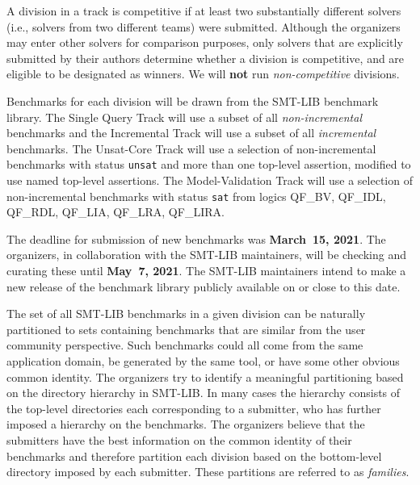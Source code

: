 \documentclass[12pt]{article}
\newcommand{\maintrack}{Single Query Track\xspace}
\newcommand{\inctrack}{Incremental Track\xspace}
\newcommand{\ucoretrack}{Unsat-Core Track\xspace}
\newcommand{\mvaltrack}{Model-Validation Track\xspace}
\newcommand{\challtrack}{Industry-Challenge Track\xspace}
\begin{document}
A division in a track is competitive if at least two substantially
different solvers (i.e., solvers from two different teams) were
submitted.  Although the organizers may enter other solvers for
comparison purposes, only solvers that are explicitly submitted by
their authors determine whether a division is competitive, and are
eligible to be designated as winners.
We will \textbf{not} run \emph{non-competitive} divisions.

Benchmarks for each division will be drawn from the SMT-LIB benchmark library.
The \maintrack will use a subset of all \emph{non-incremental} benchmarks and
the \inctrack will use a subset of all \emph{incremental} benchmarks.
%
%
The \ucoretrack will use a selection of
non-incremental benchmarks with status \texttt{unsat} and more than one
top-level assertion, modified to use named top-level assertions.  The
\mvaltrack will use a selection of non-incremental benchmarks with status
\texttt{sat} from logics QF\_BV, QF\_IDL, QF\_RDL, QF\_LIA, QF\_LRA, QF\_LIRA.

The deadline for submission of new benchmarks was {\bf March~15, 2021}.
The organizers, in collaboration with the SMT-LIB maintainers, will be
checking and curating these until {\bf May~7, 2021}.  The SMT-LIB
maintainers intend to make a new release of the benchmark library
publicly available on or close to this date.

The set of all SMT-LIB benchmarks in a given division can be naturally
partitioned to sets containing benchmarks that are similar from the user
community perspective.  Such benchmarks could all come from the same
application domain, be generated by the same tool, or have some other
obvious common identity.
%
The organizers try to identify a meaningful partitioning based on the
directory hierarchy in SMT-LIB.  In many cases the hierarchy consists of
the top-level directories each corresponding to a submitter, who has
further imposed a hierarchy on the benchmarks.
%
The organizers believe that the submitters have the best information on
the common identity of their benchmarks and therefore partition each
division based on the bottom-level directory imposed by each submitter.
These partitions are referred to as \emph{families}.
\end{document}
